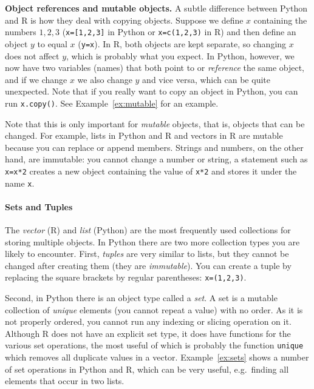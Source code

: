 \begin{feature}\textbf{Object references and mutable objects.}
  A subtle difference between Python and R is how they deal with copying objects.
  Suppose we define $x$ containing the numbers $1,2,3$ (\verb|x=[1,2,3]| in Python or \verb|x=c(1,2,3)| in R)
  and then define an object $y$ to equal $x$ (\verb|y=x|).
  In R, both objects are kept separate, so changing $x$ does not affect $y$,
  which is probably what you expect.
  In Python, however, we now have two variables (names) that both point to or \emph{reference} the same object,
  and if we change $x$ we also change $y$ and vice versa, which can be quite unexpected.
  Note that if you really want to copy an object in Python, you can run \verb|x.copy()|.
  See Example~\ref{ex:mutable} for an example.

  Note that this is only important for \emph{mutable} objects, that is,
  objects that can be changed.
  For example, lists in Python and R and vectors in R are mutable because you can replace or append members.
  Strings and numbers, on the other hand, are immutable:
  you cannot change a number or string, a statement such as \verb|x=x*2| creates a new object containing the value of \verb|x*2| and stores it under the name \verb|x|.

\end{feature}
  

\paragraph{Sets and Tuples}
The \emph{vector} (R) and \emph{list} (Python) are the most frequently used collections
for storing multiple objects. 
In Python there are two more collection types you are likely to encounter.
First, \emph{tuples} are very similar to lists, but they cannot be changed after creating them
(they are \emph{immutable}).
You can create a tuple by replacing the square brackets by regular parentheses:
\verb|x=(1,2,3)|. 

Second, in Python there is an object type called a \emph{set}.
A set is a mutable collection of \emph{unique} elements (you cannot repeat a value) with
no order. As it is not properly ordered, you cannot run any indexing
or slicing operation on it.
Although R does not have an explicit set type,
it does have functions for the various set operations,
the most useful of which is probably the function \texttt{unique} which removes all duplicate values in a vector.
Example~\ref{ex:sets} shows a number of set operations in Python and R,
which can be very useful,  e.g.\ finding all elements that occur in two lists.

